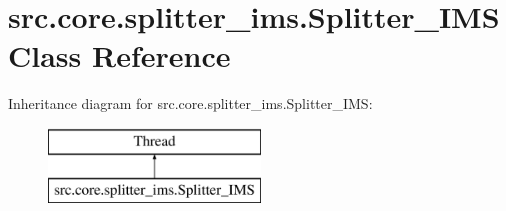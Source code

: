 \hypertarget{classsrc_1_1core_1_1splitter__ims_1_1Splitter__IMS}{}\section{src.\+core.\+splitter\+\_\+ims.\+Splitter\+\_\+\+I\+M\+S Class Reference}
\label{classsrc_1_1core_1_1splitter__ims_1_1Splitter__IMS}
Inheritance diagram for src.\+core.\+splitter\+\_\+ims.\+Splitter\+\_\+\+I\+M\+S\+:\begin{figure}[H]
\begin{center}
\leavevmode
\includegraphics[height=2.000000cm]{classsrc_1_1core_1_1splitter__ims_1_1Splitter__IMS}
\end{center}
\end{figure}
